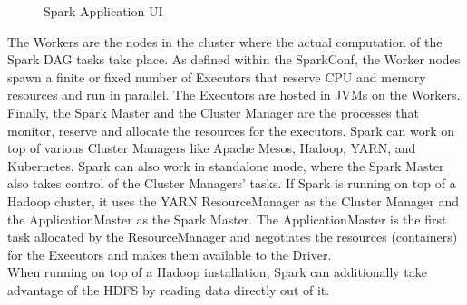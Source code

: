 \begin{figure}[htbp]
	\captionsetup[subfigure]{justification=centering}
	\centering
	\caption{Spark Application UI}
	\label{appui}
\end{figure}
\FloatBarrier

\noindent The Workers are the nodes in the cluster where the actual computation of the Spark DAG tasks take place. As defined within the SparkConf, the Worker nodes spawn a finite or fixed number of Executors that reserve CPU and memory resources and run in parallel. The Executors are hosted in JVMs on the Workers. Finally, the Spark Master and the Cluster Manager are the processes that monitor, reserve and allocate the resources for the executors. Spark can work on top of various Cluster Managers like Apache Mesos, Hadoop, YARN, and Kubernetes. Spark can also work in standalone mode, where the Spark Master also takes control of the Cluster Managers' tasks. If Spark is running on top of a Hadoop cluster, it uses the YARN ResourceManager as the Cluster Manager and the ApplicationMaster as the Spark Master. The ApplicationMaster is the first task allocated by the ResourceManager and negotiates the resources (containers) for the Executors and makes them available to the Driver. \cite[pp. 49 ff]{sparkbook1}\\
When running on top of a Hadoop installation, Spark can additionally take advantage of the HDFS by reading data directly out of it.\\

